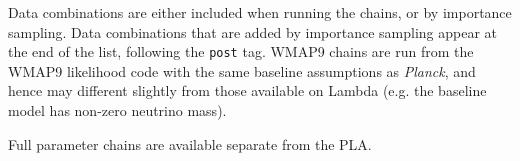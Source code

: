 Data combinations are either included when running the chains, or by importance sampling. Data combinations that are added by importance sampling appear 
at the end of the list, following the {\tt post{\textunderscore}} tag. WMAP9 chains are run from the WMAP9 likelihood code with the same baseline assumptions as \textit{Planck}, and hence
may different slightly from those available on Lambda (e.g. the baseline model has non-zero neutrino mass).

Full parameter chains are available separate from the PLA.

\newpage
